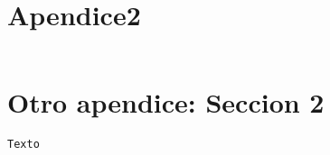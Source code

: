 \section{Apendice2}
\label{Apendice2:label}

\begin{center}
\begin{footnotesize}

\begin{verbatim}

\end{verbatim}

\end{footnotesize}
\end{center}

\section{Otro apendice: Seccion 2}
\label{Apendice2:label2}

\begin{center}
\begin{footnotesize}

\begin{verbatim}
Texto
\end{verbatim}


\end{footnotesize}
\end{center}
